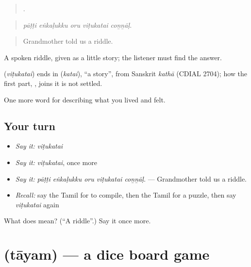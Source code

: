 \begin{quote}
    .
\end{quote}

\begin{quote}
\emph{pāṭṭi eṅkaḷukku oru viṭukatai coṉṉāḷ.}
\end{quote}

\begin{quote}
Grandmother told us a riddle.
\end{quote}

A spoken riddle, given as a little story; the listener must find the answer.

\begin{cousinweb}
\textbf{} (\emph{viṭukatai}) ends in  (\emph{katai}), \textquotedblleft{}a story\textquotedblright{}, from Sanskrit \emph{kathā} (CDIAL 2704); how the first part, , joins it is not settled.
\end{cousinweb}

\begin{grammarlens}[title={What you've built}]
One more word for describing what you lived and felt.
\end{grammarlens}

\subsection*{Your turn}
\begin{itemize}
\raggedright
  \item \emph{Say it:} \emph{viṭukatai}
  \item \emph{Say it:} \emph{viṭukatai}, once more
  \item \emph{Say it:} \emph{pāṭṭi eṅkaḷukku oru viṭukatai coṉṉāḷ.} — Grandmother told us a riddle.
  \item \emph{Recall:} say the Tamil for to compile, then the Tamil for a puzzle, then say \emph{viṭukatai} again
\end{itemize}

\begin{tcolorbox}[breakable,colback=teal!4,colframe=teal!35!black,title={Before you move on}]
What does  mean? (\textquotedblleft{}A riddle\textquotedblright{}.) Say it once more.
\end{tcolorbox}
\section[\texorpdfstring{\ta{தாயம்} (tāyam)}{தாயம் (tāyam)}]{ (tāyam) — a dice board game}

